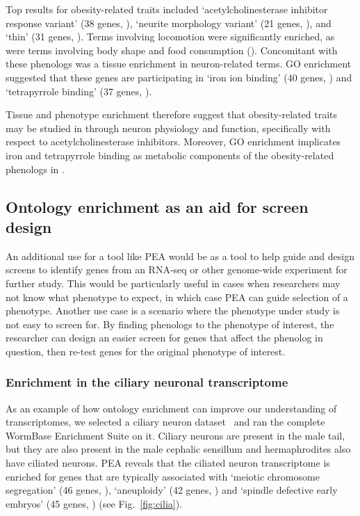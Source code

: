 Top results for obesity-related traits included `acetylcholinesterase inhibitor
response variant' (38 genes, ),
`neurite morphology variant' (21 genes, ),
and `thin' (31 genes, ).
Terms involving locomotion were significantly enriched, as were terms involving
body shape and food consumption (). Concomitant with these phenologs was
a tissue enrichment in neuron-related terms. GO enrichment suggested that these
genes are participating in `iron ion binding' (40 genes, ) and
`tetrapyrrole binding' (37 genes, ).

Tissue and phenotype enrichment therefore suggest that obesity-related traits
may be studied in \cel{} through neuron physiology and function, specifically
with respect to acetylcholinesterase inhibitors. Moreover, GO enrichment
implicates iron and tetrapyrrole binding as metabolic components of
the obesity-related phenologs in \cel{}.

\subsection*{Ontology enrichment as an aid for screen design}
An additional use for a tool like PEA would be as a tool to help guide and
design screens to identify genes from an RNA-seq or other genome-wide experiment
for further study. This would be particularly useful in cases when researchers
may not know what phenotype to expect, in which case PEA can guide selection of
a phenotype. Another use case is a scenario where the phenotype under study is
not easy to screen for. By finding phenologs to the phenotype of interest, the
researcher can design an easier screen for genes that affect the phenolog in
question, then re-test genes for the original phenotype of interest.

\subsubsection*{Enrichment in the ciliary neuronal transcriptome}
As an example of how ontology enrichment can improve our understanding of
transcriptomes,
we selected a ciliary neuron dataset~\citep{Wang2015} and ran the complete WormBase
Enrichment Suite on it. Ciliary neurons are present in the \cel{} male tail, but
they are also present in the male cephalic sensillum and hermaphrodites also have
ciliated neurons. PEA reveals that the ciliated
neuron transcriptome is enriched for genes that are typically associated with
`meiotic chromosome segregation' (46 genes, ),
`aneuploidy' (42 genes, ) and `spindle defective early embryos' (45
genes, ) (see Fig.~\ref{fig:cilia}).

